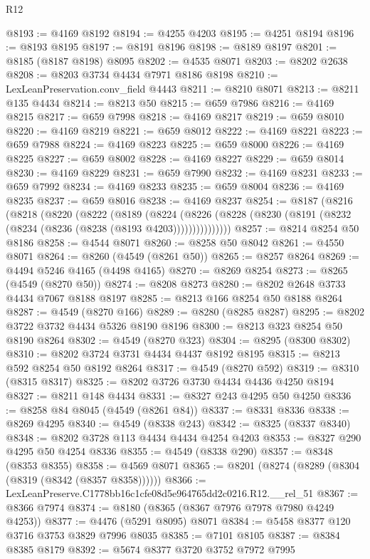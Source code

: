 \begin{lexlean}{R12}
\begin{coremodule}
@8193 := @4169 @8192
@8194 := @4255 @4203
@8195 := @4251 @8194
@8196 := @8193 @8195
@8197 := @8191 @8196
@8198 := @8189 @8197
@8201 := @8185 (@8187 @8198) @8095
@8202 := @4535 @8071
@8203 := @8202 @2638
@8208 := @8203 @3734 @4434 @7971 @8186 @8198
@8210 := LexLeanPreservation.conv_field @4443
@8211 := @8210 @8071
@8213 := @8211 @135 @4434
@8214 := @8213 @50
@8215 := @659 @7986
@8216 := @4169 @8215
@8217 := @659 @7998
@8218 := @4169 @8217
@8219 := @659 @8010
@8220 := @4169 @8219
@8221 := @659 @8012
@8222 := @4169 @8221
@8223 := @659 @7988
@8224 := @4169 @8223
@8225 := @659 @8000
@8226 := @4169 @8225
@8227 := @659 @8002
@8228 := @4169 @8227
@8229 := @659 @8014
@8230 := @4169 @8229
@8231 := @659 @7990
@8232 := @4169 @8231
@8233 := @659 @7992
@8234 := @4169 @8233
@8235 := @659 @8004
@8236 := @4169 @8235
@8237 := @659 @8016
@8238 := @4169 @8237
@8254 := @8187
    (@8216
      (@8218
        (@8220
          (@8222
            (@8189
              (@8224
                (@8226 (@8228 (@8230 (@8191 (@8232 (@8234 (@8236 (@8238 (@8193 @4203)))))))))))))))
@8257 := @8214 @8254 @50 @8186
@8258 := @4544 @8071
@8260 := @8258 @50 @8042
@8261 := @4550 @8071
@8264 := @8260 (@4549 (@8261 @50))
@8265 := @8257 @8264
@8269 := @4494 @5246 @4165 (@4498 @4165)
@8270 := @8269 @8254
@8273 := @8265 (@4549 (@8270 @50))
@8274 := @8208 @8273
@8280 := @8202 @2648 @3733 @4434 @7067 @8188 @8197
@8285 := @8213 @166 @8254 @50 @8188 @8264
@8287 := @4549 (@8270 @166)
@8289 := @8280 (@8285 @8287)
@8295 := @8202 @3722 @3732 @4434 @5326 @8190 @8196
@8300 := @8213 @323 @8254 @50 @8190 @8264
@8302 := @4549 (@8270 @323)
@8304 := @8295 (@8300 @8302)
@8310 := @8202 @3724 @3731 @4434 @4437 @8192 @8195
@8315 := @8213 @592 @8254 @50 @8192 @8264
@8317 := @4549 (@8270 @592)
@8319 := @8310 (@8315 @8317)
@8325 := @8202 @3726 @3730 @4434 @4436 @4250 @8194
@8327 := @8211 @148 @4434
@8331 := @8327 @243 @4295 @50 @4250
@8336 := @8258 @84 @8045 (@4549 (@8261 @84))
@8337 := @8331 @8336
@8338 := @8269 @4295
@8340 := @4549 (@8338 @243)
@8342 := @8325 (@8337 @8340)
@8348 := @8202 @3728 @113 @4434 @4434 @4254 @4203
@8353 := @8327 @290 @4295 @50 @4254 @8336
@8355 := @4549 (@8338 @290)
@8357 := @8348 (@8353 @8355)
@8358 := @4569 @8071
@8365 := @8201 (@8274 (@8289 (@8304 (@8319 (@8342 (@8357 @8358))))))
@8366 := LexLeanPreserve.C1778bb16c1cfe08d5e964765dd2c0216.R12.__rel_51
@8367 := @8366 @7974
@8374 := @8180 (@8365 (@8367 @7976 @7978 @7980 @4249 @4253))
@8377 := @4476 (@5291 @8095) @8071
@8384 := @5458 @8377 @120 @3716 @3753 @3829 @7996 @8035
@8385 := @7101 @8105
@8387 := @8384 @8385 @8179
@8392 := @5674 @8377 @3720 @3752 @7972 @7995

\end{coremodule}
\end{lexlean}
